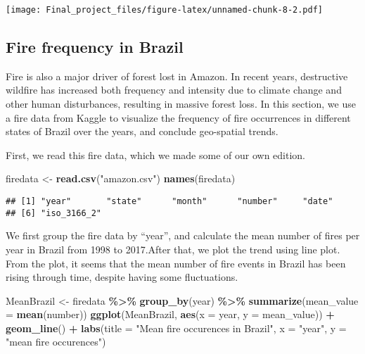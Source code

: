 \documentclass[
]{article}
\newenvironment{Shaded}{\begin{snugshade}}{\end{snugshade}}
\newcommand{\AttributeTok}[1]{\textcolor[rgb]{0.13,0.29,0.53}{#1}}
\newcommand{\FunctionTok}[1]{\textcolor[rgb]{0.13,0.29,0.53}{\textbf{#1}}}
\newcommand{\NormalTok}[1]{#1}
\newcommand{\OtherTok}[1]{\textcolor[rgb]{0.56,0.35,0.01}{#1}}
\newcommand{\SpecialCharTok}[1]{\textcolor[rgb]{0.81,0.36,0.00}{\textbf{#1}}}
\newcommand{\StringTok}[1]{\textcolor[rgb]{0.31,0.60,0.02}{#1}}
\begin{document}
\texttt{[image: Final\_project\_files/figure-latex/unnamed-chunk-8-2.pdf]}

\hypertarget{fire-frequency-in-brazil}{%
\subsection{Fire frequency in Brazil}\label{fire-frequency-in-brazil}}

Fire is also a major driver of forest lost in Amazon. In recent years,
destructive wildfire has increased both frequency and intensity due to
climate change and other human disturbances, resulting in massive forest
loss. In this section, we use a fire data from Kaggle to visualize the
frequency of fire occurrences in different states of Brazil over the
years, and conclude geo-spatial trends.

First, we read this fire data, which we made some of our own edition.

\begin{Shaded}
\begin{Highlighting}[]
\NormalTok{firedata }\OtherTok{\textless{}{-}} \FunctionTok{read.csv}\NormalTok{(}\StringTok{"amazon.csv"}\NormalTok{)}
\FunctionTok{names}\NormalTok{(firedata)}
\end{Highlighting}
\end{Shaded}

\begin{verbatim}
## [1] "year"       "state"      "month"      "number"     "date"      
## [6] "iso_3166_2"
\end{verbatim}

We first group the fire data by ``year'', and calculate the mean number
of fires per year in Brazil from 1998 to 2017.After that, we plot the
trend using line plot. From the plot, it seems that the mean number of
fire events in Brazil has been rising through time, despite having some
fluctuations.

\begin{Shaded}
\begin{Highlighting}[]
\NormalTok{MeanBrazil }\OtherTok{\textless{}{-}}\NormalTok{ firedata }\SpecialCharTok{\%\textgreater{}\%}
  \FunctionTok{group\_by}\NormalTok{(year) }\SpecialCharTok{\%\textgreater{}\%}
  \FunctionTok{summarize}\NormalTok{(}\AttributeTok{mean\_value =} \FunctionTok{mean}\NormalTok{(number))}
\FunctionTok{ggplot}\NormalTok{(MeanBrazil, }\FunctionTok{aes}\NormalTok{(}\AttributeTok{x =}\NormalTok{ year, }\AttributeTok{y =}\NormalTok{ mean\_value)) }\SpecialCharTok{+}
  \FunctionTok{geom\_line}\NormalTok{() }\SpecialCharTok{+}
  \FunctionTok{labs}\NormalTok{(}\AttributeTok{title =} \StringTok{"Mean fire occurences in Brazil"}\NormalTok{, }\AttributeTok{x =} \StringTok{"year"}\NormalTok{, }\AttributeTok{y =} \StringTok{"mean fire occurences"}\NormalTok{)     }
\end{Highlighting}
\end{Shaded}
\end{document}
